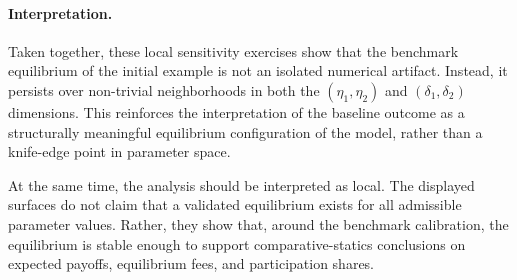 \paragraph{Interpretation.}

Taken together, these local sensitivity exercises show that the benchmark equilibrium of the initial example is not an isolated numerical artifact. Instead, it persists over non-trivial neighborhoods in both the \((\eta_1,\eta_2)\) and \((\delta_1,\delta_2)\) dimensions. This reinforces the interpretation of the baseline outcome as a structurally meaningful equilibrium configuration of the model, rather than a knife-edge point in parameter space.

At the same time, the analysis should be interpreted as local. The displayed surfaces do not claim that a validated equilibrium exists for all admissible parameter values. Rather, they show that, around the benchmark calibration, the equilibrium is stable enough to support comparative-statics conclusions on expected payoffs, equilibrium fees, and participation shares.




















